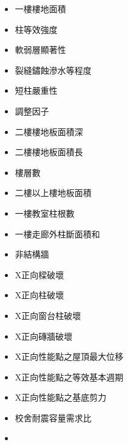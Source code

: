 \begin{multicols}{2}
\begin{itemize}
\item 一樓樓地面積
\item 柱等效強度
\item 軟弱層顯著性
\item 裂縫鏽蝕滲水等程度
\item 短柱嚴重性
\item 調整因子
\item 二樓樓地板面積深
\item 二樓樓地板面積長
\item 樓層數
\item 二樓以上樓地板面積
\item 一樓教室柱根數
\item 一樓走廊外柱斷面積和
\item 非結構牆
\item X正向樑破壞
\item X正向柱破壞
\item X正向窗台柱破壞
\item X正向磚牆破壞
\item X正向性能點之屋頂最大位移
\item X正向性能點之等效基本週期
\item X正向性能點之基底剪力
\item 校舍耐震容量需求比
\item[]
\end{itemize}
\end{multicols}

